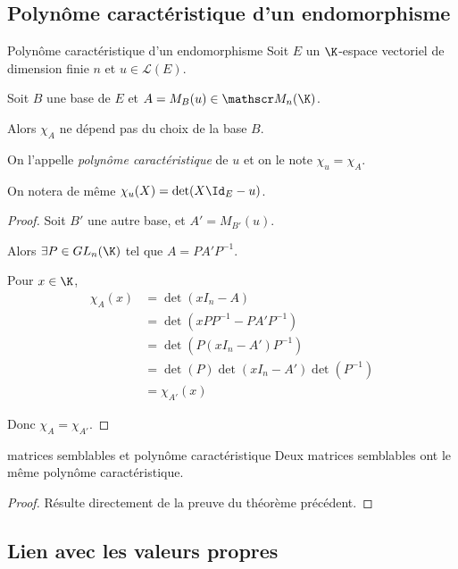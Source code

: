 \subsection{Polynôme caractéristique d'un endomorphisme}

\begin{theoreme}{Polynôme caractéristique d'un endomorphisme}{}
    Soit $E$ un $\K$-espace vectoriel de dimension finie $n$ et $u \in \mathscr L(E)$.

    Soit $B$ une base de $E$ et $A = M_B(u) \in \mathscr M_n(\K)$. 

    Alors $\chi_A$ ne dépend pas du choix de la base $B$.

    On l'appelle \emph{polynôme caractéristique} de $u$ et on le note $\chi_u = \chi_A$.

    On notera de même $\chi_u(X) = \det(X \Id_E - u)$.
\end{theoreme}


\begin{proof}
    Soit $B'$ une autre base, et $A' = M_{B'}(u)$.

    Alors $\exists P \in GL_n(\K)$ tel que $A = P A' P^{-1}$.

    Pour $x \in \K$, 
    \begin{align}
        \chi_A(x) & = \det(x I_n - A) \\
                        & = \det(x PP^{-1} - P A' P^{-1}) \\
                        & = \det(P(x I_n - A') P^{-1}) \\
                        & = \det(P) \det(x I_n - A') \det(P^{-1}) \\
                        & = \chi_{A'}(x)
    \end{align}

    Donc $\chi_A = \chi_{A'}$.
\end{proof}

\begin{corollaire}{matrices semblables et polynôme caractéristique}{}
    Deux matrices semblables ont le même polynôme caractéristique.
\end{corollaire}

\begin{proof}
    Résulte directement de la preuve du théorème précédent.
\end{proof}


\subsection{Lien avec les valeurs propres }

